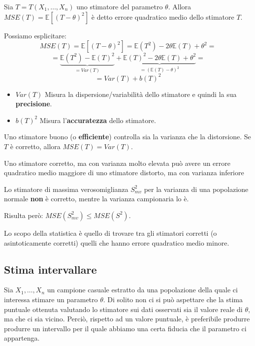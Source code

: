 \documentclass[a4paper]{article}
\theoremstyle{break}
\theoremstyle{break}
\theoremstyle{break}
\theoremstyle{break}
\begin{document}
\begin{definition}
  Sia \( T = T(X_1, \ldots, X_n) \) uno stimatore del parametro \( \theta \). Allora
  \( MSE(T) = \mathbb{E}[(T- \theta)^2] \) è detto errore quadratico medio dello
  stimatore \( T \).

  \vspace{1em}
  \noindent Possiamo esplicitare:
  \[
    MSE(T) = \mathbb{E}[(T-\theta)^2] = \mathbb{E}(T^2) - 2\theta \mathbb{E}(T) + \theta^2 =
  \] 
  \[
    = \underbrace{\mathbb{E}(T^2) - \mathbb{E}(T)^2}_{= Var(T)} + \underbrace{\mathbb{E}(T)^2 - 2 \theta \mathbb{E}(T) + \theta^2}_{= (\mathbb{E}(T)-\theta)^2} =
  \] 
  \[
    = Var(T) + b(T)^2
  \] 
  \begin{itemize}
    \item \( Var(T) \) Misura la dispersione/variabilità dello stimatore e quindi la sua
      \textbf{precisione}.
    \item \( b(T)^2 \) Misura l'\textbf{accuratezza} dello stimatore.
  \end{itemize}

  \noindent Uno stimatore buono (o \textbf{efficiente}) controlla sia la varianza che la distorsione.
  Se \( T \) è corretto, allora \( MSE(T) = Var(T) \).

  \vspace{1em}
  \noindent Uno stimatore corretto, ma con varianza molto elevata può avere un errore
  quadratico medio maggiore di uno stimatore distorto, ma con varianza inferiore
\end{definition}

\begin{example}
  Lo stimatore di massima verosomiglianza \( S^2_{mv} \) per la varianza di una popolazione
  normale \textbf{non} è corretto, mentre la varianza campionaria lo è.

  \vspace{1em}
  \noindent Risulta però: \( MSE(S^2_{mv}) \le MSE(S^2) \).
\end{example}

\noindent Lo scopo della statistica è quello di trovare tra gli stimatori corretti (o
asintoticamente corretti) quelli che hanno errore quadratico medio minore.


\subsection{Stima intervallare}
Sia \( X_1, \ldots, X_n \) un campione casuale estratto da una popolazione della quale
ci interessa stimare un parametro \( \theta \). Di solito non ci si può aspettare che la
stima puntuale ottenuta valutando lo stimatore sui dati osservati sia il valore reale
di \( \theta \), ma che ci sia vicino. Perciò, rispetto ad un valore puntuale, è
preferibile produrre produrre un intervallo per il quale abbiamo una certa fiducia che il
parametro ci appartenga.
\end{document}
